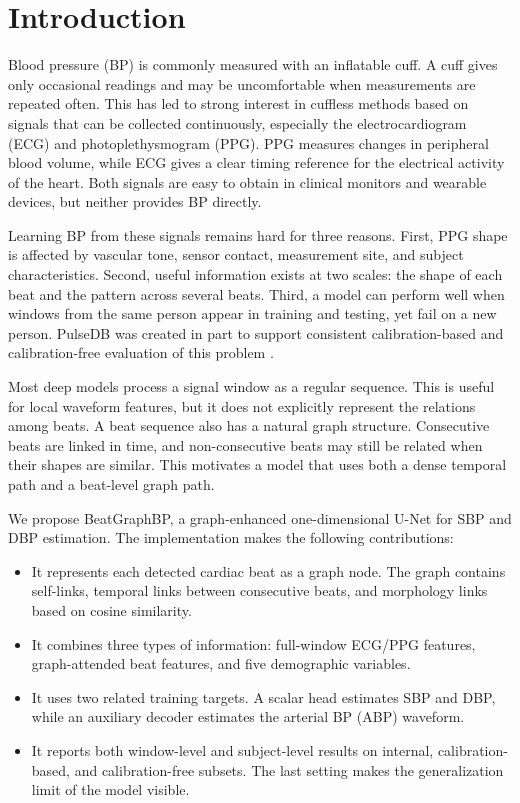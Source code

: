 \documentclass[journal,twoside,web]{ieeecolor}
\begin{document}
\maketitle

\section{Introduction}\label{sec:introduction}

Blood pressure (BP) is commonly measured with an inflatable cuff. A cuff gives only occasional readings and may be uncomfortable when measurements are repeated often. This has led to strong interest in cuffless methods based on signals that can be collected continuously, especially the electrocardiogram (ECG) and photoplethysmogram (PPG). PPG measures changes in peripheral blood volume, while ECG gives a clear timing reference for the electrical activity of the heart. Both signals are easy to obtain in clinical monitors and wearable devices, but neither provides BP directly.

Learning BP from these signals remains hard for three reasons. First, PPG shape is affected by vascular tone, sensor contact, measurement site, and subject characteristics. Second, useful information exists at two scales: the shape of each beat and the pattern across several beats. Third, a model can perform well when windows from the same person appear in training and testing, yet fail on a new person. PulseDB was created in part to support consistent calibration-based and calibration-free evaluation of this problem \cite{wang2023pulsedb}.

Most deep models process a signal window as a regular sequence. This is useful for local waveform features, but it does not explicitly represent the relations among beats. A beat sequence also has a natural graph structure. Consecutive beats are linked in time, and non-consecutive beats may still be related when their shapes are similar. This motivates a model that uses both a dense temporal path and a beat-level graph path.

We propose BeatGraphBP, a graph-enhanced one-dimensional U-Net for SBP and DBP estimation. The implementation makes the following contributions:

\begin{itemize}
    \item It represents each detected cardiac beat as a graph node. The graph contains self-links, temporal links between consecutive beats, and morphology links based on cosine similarity.
    \item It combines three types of information: full-window ECG/PPG features, graph-attended beat features, and five demographic variables.
    \item It uses two related training targets. A scalar head estimates SBP and DBP, while an auxiliary decoder estimates the arterial BP (ABP) waveform.
    \item It reports both window-level and subject-level results on internal, calibration-based, and calibration-free subsets. The last setting makes the generalization limit of the model visible.
\end{itemize}
\end{document}
